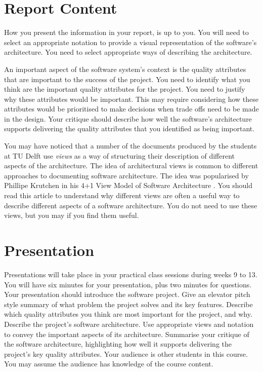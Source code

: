 \documentclass{csse4400}
\begin{document}
\section{Report Content}
How you present the information in your report, is up to you. You will need to select an appropriate notation 
to provide a visual representation of the software's architecture. You need to select appropriate ways of describing
the architecture.

An important aspect of the software system's context is the quality attributes that are important to the success of the project.
You need to identify what you think are the important quality attributes for the project. 
You need to justify why these attributes would be important.
This may require considering how these attributes would be prioritised to make decisions when trade offs need to be made in the design.
Your critique should describe how well the software's architecture supports delivering the quality attributes that you identified as being important.

You may have noticed that a number of the documents produced by the students at TU Delft use \textsl{views} 
as a way of structuring their description of different aspects of the architecture. The idea of architectural views
is common to different approaches to documenting software architecture. The idea was popularised by Phillipe 
Krutchen in his 4+1 View Model of Software Architecture \cite{4+1-model}.
You should read this article to understand why different views are often a useful way to describe different
aspects of a software architecture. You do not need to use these views, but you may if you find them useful.

\section{Presentation}
Presentations will take place in your practical class sessions during weeks 9 to 13.
You will have six minutes for your presentation, plus two minutes for questions.
Your presentation should introduce the software project.
Give an elevator pitch style summary of what problem the project solves and its key features.
Describe which quality attributes you think are most important for the project, and why.
Describe the project's software architecture. Use appropriate views and notation to convey the important aspects of its architecture.
Summarise your critique of the software architecture, highlighting how well it supports delivering the project's key quality attributes.
Your audience is other students in this course. You may assume the audience has knowledge of the course content.
\end{document}
